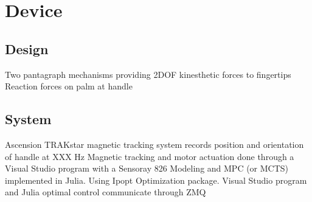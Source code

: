 \section{Device}

\subsection{Design}
\begin{outline}
\1 Two pantagraph mechanisms providing 2DOF kinesthetic forces to fingertips
\1 Reaction forces on palm at handle

\end{outline}

\subsection{System}
\begin{outline}
\1 Ascension TRAKstar magnetic tracking system records position and orientation of handle at XXX Hz
\1 Magnetic tracking and motor actuation done through a Visual Studio program with a Sensoray 826 
\1 Modeling and MPC (or MCTS) implemented in Julia. Using Ipopt Optimization package.
\1 Visual Studio program and Julia optimal control communicate through ZMQ
\end{outline}
